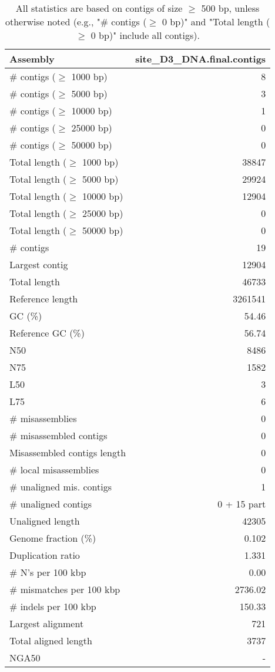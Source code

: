 \documentclass[12pt,a4paper]{article}
\begin{document}
\begin{table}[ht]
\begin{center}
\caption{All statistics are based on contigs of size $\geq$ 500 bp, unless otherwise noted (e.g., "\# contigs ($\geq$ 0 bp)" and "Total length ($\geq$ 0 bp)" include all contigs).}
\begin{tabular}{|l*{1}{|r}|}
\hline
Assembly & site\_D3\_DNA.final.contigs \\ \hline
\# contigs ($\geq$ 1000 bp) & 8 \\ \hline
\# contigs ($\geq$ 5000 bp) & 3 \\ \hline
\# contigs ($\geq$ 10000 bp) & 1 \\ \hline
\# contigs ($\geq$ 25000 bp) & 0 \\ \hline
\# contigs ($\geq$ 50000 bp) & 0 \\ \hline
Total length ($\geq$ 1000 bp) & 38847 \\ \hline
Total length ($\geq$ 5000 bp) & 29924 \\ \hline
Total length ($\geq$ 10000 bp) & 12904 \\ \hline
Total length ($\geq$ 25000 bp) & 0 \\ \hline
Total length ($\geq$ 50000 bp) & 0 \\ \hline
\# contigs & 19 \\ \hline
Largest contig & 12904 \\ \hline
Total length & 46733 \\ \hline
Reference length & 3261541 \\ \hline
GC (\%) & 54.46 \\ \hline
Reference GC (\%) & 56.74 \\ \hline
N50 & 8486 \\ \hline
N75 & 1582 \\ \hline
L50 & 3 \\ \hline
L75 & 6 \\ \hline
\# misassemblies & 0 \\ \hline
\# misassembled contigs & 0 \\ \hline
Misassembled contigs length & 0 \\ \hline
\# local misassemblies & 0 \\ \hline
\# unaligned mis. contigs & 1 \\ \hline
\# unaligned contigs & 0 + 15 part \\ \hline
Unaligned length & 42305 \\ \hline
Genome fraction (\%) & 0.102 \\ \hline
Duplication ratio & 1.331 \\ \hline
\# N's per 100 kbp & 0.00 \\ \hline
\# mismatches per 100 kbp & 2736.02 \\ \hline
\# indels per 100 kbp & 150.33 \\ \hline
Largest alignment & 721 \\ \hline
Total aligned length & 3737 \\ \hline
NGA50 & - \\ \hline
\end{tabular}
\end{center}
\end{table}
\end{document}
